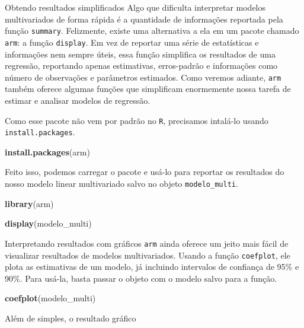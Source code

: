 \documentclass[
  9pt,
  ignorenonframetext,
  aspectratio=169]{beamer}
\newenvironment{Shaded}{\begin{snugshade}}{\end{snugshade}}
\newcommand{\KeywordTok}[1]{\textcolor[rgb]{0.13,0.29,0.53}{\textbf{#1}}}
\newcommand{\NormalTok}[1]{#1}
\begin{document}
\begin{frame}[fragile]{Obtendo resultados simplificados}
\protect\hypertarget{obtendo-resultados-simplificados}{}
Algo que dificulta interpretar modelos multivariados de forma rápida é a
quantidade de informações reportada pela função \texttt{summary}.
Felizmente, existe uma alternativa a ela em um pacote chamado
\texttt{arm}: a função \texttt{display}. Em vez de reportar uma série de
estatísticas e informações nem sempre úteis, essa função simplifica os
resultados de uma regressão, reportando apenas estimativas, erros-padrão
e informações como número de observações e parâmetros estimados. Como
veremos adiante, \texttt{arm} também oferece algumas funções que
simplificam enormemente nossa tarefa de estimar e analisar modelos de
regressão.

Como esse pacote não vem por padrão no \texttt{R}, precisamos intalá-lo
usando \texttt{install.packages}.

\begin{Shaded}
\begin{Highlighting}[]
\KeywordTok{install.packages}\NormalTok{(arm)}
\end{Highlighting}
\end{Shaded}

Feito isso, podemos carregar o pacote e usá-lo para reportar os
resultados do nosso modelo linear multivariado salvo no objeto
\texttt{modelo\_multi}.

\begin{Shaded}
\begin{Highlighting}[]
\KeywordTok{library}\NormalTok{(arm)}

\KeywordTok{display}\NormalTok{(modelo\_multi)}
\end{Highlighting}
\end{Shaded}
\end{frame}

\begin{frame}[fragile]{Interpretando resultados com gráficos}
\protect\hypertarget{interpretando-resultados-com-gruxe1ficos}{}
\texttt{arm} ainda oferece um jeito mais fácil de visualizar resultados
de modelos multivariados. Usando a função \texttt{coefplot}, ele plota
as estimativas de um modelo, já incluindo intervalos de confiança de
95\% e 90\%. Para usá-la, basta passar o objeto com o modelo salvo para
a função.

\begin{Shaded}
\begin{Highlighting}[]
\KeywordTok{coefplot}\NormalTok{(modelo\_multi)}
\end{Highlighting}
\end{Shaded}

Além de simples, o resultado gráfico
\end{frame}
\end{document}
